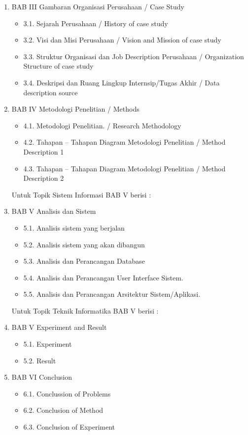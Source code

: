 \begin{enumerate}
\begin{enumerate}
\item BAB III Gambaran Organisasi Perusahaan / Case Study
\begin{itemize}
\item 3.1.	Sejarah Perusahaan / History of case study
\item 3.2.	Visi dan Misi Perusahaan / Vision and Mission of case study
\item 3.3.	Struktur Organisasi dan Job Description Perusahaan / Organization Structure of case study
\item 3.4.	Deskripsi dan Ruang Lingkup Internsip/Tugas Akhir / Data description source
\end{itemize}
\item BAB IV Metodologi Penelitian / Methods
\begin{itemize}
\item 4.1.	Metodologi Penelitian. / 	Research Methodology 
\item 4.2.  Tahapan – Tahapan Diagram Metodologi Penelitian / Method Description 1
\item 4.3.  Tahapan – Tahapan Diagram Metodologi Penelitian / Method Description 2
\end{itemize}

Untuk Topik Sistem Informasi BAB V berisi :
\item BAB V Analisis dan Sistem
\begin{itemize}
\item 5.1.	Analisis sistem yang berjalan
\item 5.2.	Analisis sistem yang akan dibangun
\item 5.3.	Analisis dan Perancangan Database
\item 5.4.	Analisis dan Perancangan User Interface Sistem. 
\item 5.5.	Analisis dan Perancangan Arsitektur Sistem/Aplikasi.
\end{itemize}

Untuk Topik Teknik Informatika BAB V berisi :
\item BAB V Experiment and Result
\begin{itemize}
\item 5.1.	Experiment
\item 5.2.	Result
\end{itemize}

\item BAB VI Conclusion
\begin{itemize}
\item 6.1.	Conclussion of Problems
\item 6.2.  Conclusion of Method
\item 6.3.  Conclusion of Experiment
\end{itemize}


\end{enumerate}
\end{enumerate}
